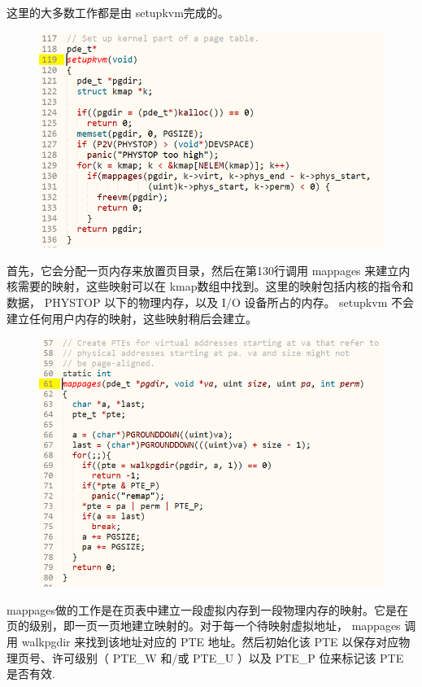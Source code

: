 \documentclass[a4paper,12pt]{report}
\begin{document}
这里的大多数工作都是由 setupkvm完成的。
\begin{figure}[H]
	\centering
	\includegraphics [width=1.0\textwidth]{figure//media//image7.png}
\end{figure}
首先，它会分配一页内存来放置页目录，然后在第130行调用 mappages 来建立内核需要的映射，这些映射可以在 kmap数组中找到。这里的映射包括内核的指令和数据， PHYSTOP 以下的物理内存，以及 I/O 设备所占的内存。 setupkvm 不会建立任何用户内存的映射，这些映射稍后会建立。
\begin{figure}[H]
	\centering
	\includegraphics [width=1.0\textwidth]{figure//media//image8.png}
\end{figure}
mappages做的工作是在页表中建立一段虚拟内存到一段物理内存的映射。它是在页的级别，即一页一页地建立映射的。对于每一个待映射虚拟地址， mappages 调用 walkpgdir 来找到该地址对应的 PTE 地址。然后初始化该 PTE 以保存对应物理页号、许可级别（ PTE\_W 和/或 PTE\_U ）以及 PTE\_P 位来标记该 PTE 是否有效.
\end{document}
